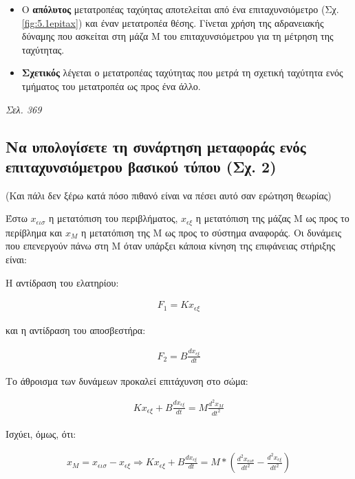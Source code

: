 \documentclass{article}
\begin{document}
\begin{itemize}
    \item Ο \textbf{απόλυτος} μετατροπέας ταχύητας αποτελείται από ένα επιταχυνσιόμετρο (Σχ. \ref{fig:5.1epitax}) και έναν μετατροπέα θέσης.
        Γίνεται χρήση της  αδρανειακής δύναμης που ασκείται στη μάζα Μ του επιταχυνσιόμετρου για τη μέτρηση της ταχύτητας.
    \item \textbf{Σχετικός} λέγεται ο μετατροπέας ταχύτητας που μετρά τη σχετική ταχύτητα ενός τμήματος του μετατροπέα ως προς ένα άλλο.
\end{itemize}

\emph{Σελ. 369}

\subsection{Να υπολογίσετε τη συνάρτηση μεταφοράς ενός επιταχυνσιόμετρου βασικού τύπου (Σχ. 2)}
(Και πάλι δεν ξέρω κατά πόσο πιθανό είναι να πέσει αυτό σαν ερώτηση θεωρίας)

Έστω $x_{\epsilon\iota\sigma}$ η μετατόπιση του περιβλήματος, $x_{\epsilon\xi}$ η μετατόπιση της μάζας Μ ως προς το περίβλημα και $x_M$
η μετατόπιση της Μ ως προς το σύστημα αναφοράς. Οι δυνάμεις που επενεργούν πάνω στη Μ όταν υπάρξει κάποια κίνηση της επιφάνειας στήριξης 
είναι:

Η αντίδραση του ελατηρίου:

\begin{align*}
    F_1 = Kx_{\epsilon\xi}
\end{align*}

και η αντίδραση του αποσβεστήρα:

\begin{align*}
    F_2 = B\frac{dx_{\epsilon\xi}}{dt}
\end{align*}

Το άθροισμα των δυνάμεων προκαλεί επιτάχυνση στο σώμα:

\begin{align*}
    Kx_{\epsilon\xi} + B\frac{dx_{\epsilon\xi}}{dt} = M\frac{d^2x_M}{dt^2}
\end{align*}

Ισχύει, όμως, ότι: 

\begin{align*}
    x_M = x_{\epsilon\iota\sigma} - x_{\epsilon\xi} \Rightarrow Kx_{\epsilon\xi} + B\frac{dx_{\epsilon\xi}}{dt} = M*\left(\frac{d^2x_{\epsilon\iota\sigma}}{dt^2} - \frac{d^2x_{\epsilon\xi}}{dt^2}\right)
\end{align*}
\end{document}
